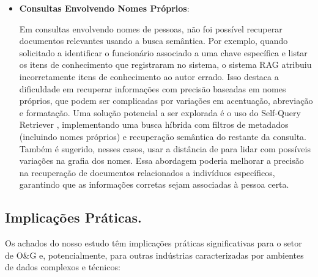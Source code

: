 \begin{itemize}
            
                \item \textbf{Consultas Envolvendo Nomes Próprios}:
                
                    Em consultas envolvendo nomes de pessoas, não foi possível recuperar documentos relevantes usando a busca semântica. Por exemplo, quando solicitado a identificar o funcionário associado a uma chave específica e listar os itens de conhecimento que registraram no sistema, o sistema RAG atribuiu incorretamente itens de conhecimento ao autor errado. Isso destaca a dificuldade em recuperar informações com precisão baseadas em nomes próprios, que podem ser complicadas por variações em acentuação, abreviação e formatação.
                    Uma solução potencial a ser explorada é o uso do Self-Query Retriever \cite{LangchainSelfQuery2023}, implementando uma busca híbrida com filtros de metadados (incluindo nomes próprios) e recuperação semântica do restante da consulta. Também é sugerido, nesses casos, usar a distância de \cite{Levenshtein1966} para lidar com possíveis variações na grafia dos nomes. Essa abordagem poderia melhorar a precisão na recuperação de documentos relacionados a indivíduos específicos, garantindo que as informações corretas sejam associadas à pessoa certa.
                
            \end{itemize}
            
    
        \subsection{Implicações Práticas.} 
            Os achados do nosso estudo têm implicações práticas significativas para o setor de O\&G e, potencialmente, para outras indústrias caracterizadas por ambientes de dados complexos e técnicos:
            
